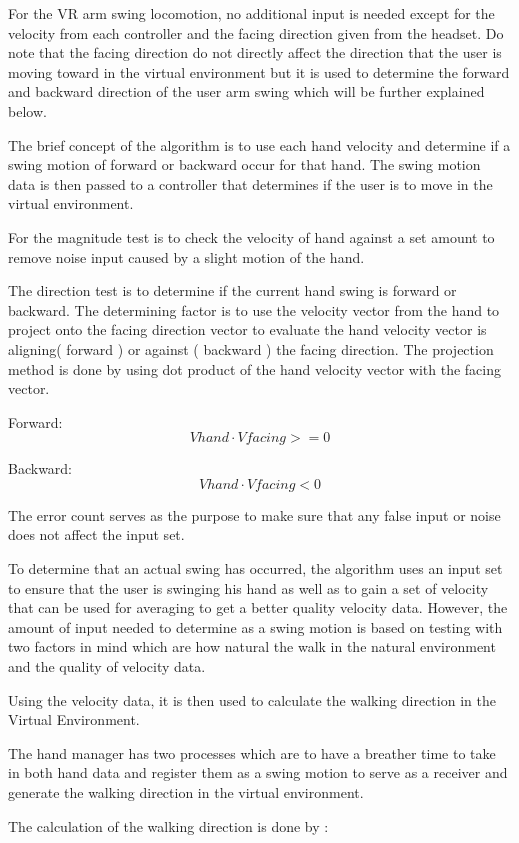 \documentclass[manuscript,review,anonymous]{acmart}
\begin{document}
For the VR arm swing locomotion, no additional input is needed except for the velocity from each controller and the facing direction given from the headset. Do note that the facing direction do not directly affect the direction that the user is moving toward in the virtual environment but it is used to determine the forward and backward direction of the user arm swing which will be further explained below.

The brief concept of the algorithm is to use each hand velocity and determine if a swing motion of forward or backward occur for that hand. The swing motion data is then passed to a controller that determines if the user is to move in the virtual environment.

For the magnitude test is to check the velocity of hand against a set amount to remove noise input caused by a slight motion of the hand.

The direction test is to determine if the current hand swing is forward or backward. The determining factor is to use the velocity vector from the hand to project onto the facing direction vector to evaluate the hand velocity vector is aligning( forward ) or against ( backward ) the facing direction. The projection method is done by using dot product of the hand velocity vector with the facing vector.

Forward: \[ \displaystyle Vhand \cdot Vfacing >= 0\]

Backward: \[ \displaystyle Vhand \cdot Vfacing < 0\]

The error count serves as the purpose to make sure that any false input or noise does not affect the input set.

To determine that an actual swing has occurred, the algorithm uses an input set to ensure that the user is swinging his hand as well as to gain a set of velocity that can be used for averaging to get a better quality velocity data. However, the amount of input needed to determine as a swing motion is based on testing with two factors in mind which are how natural the walk in the natural environment and the quality of velocity data. 

Using the velocity data, it is then used to calculate the walking direction in the Virtual Environment.

The hand manager has two processes which are to have a breather time to take in both hand data and register them as a swing motion to serve as a receiver and generate the walking direction in the virtual environment.

The calculation of the walking direction is done by :
\end{document}
